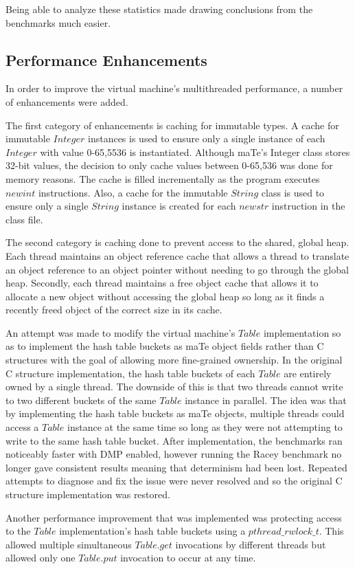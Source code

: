 Being able to analyze these statistics made drawing conclusions from
the benchmarks much easier.

\subsection{Performance Enhancements}

In order to improve the virtual machine's multithreaded performance, a
number of enhancements were added.

The first category of enhancements is caching for immutable types.  A
cache for immutable $Integer$ instances is used to ensure only a
single instance of each $Integer$ with value 0-65,5536 is
instantiated.  Although maTe's Integer class stores 32-bit values, the
decision to only cache values between 0-65,536 was done for memory
reasons.  The cache is filled incrementally as the program executes
$newint$ instructions.  Also, a cache for the immutable $String$ class
is used to ensure only a single $String$ instance is created for each
$newstr$ instruction in the class file.

The second category is caching done to prevent access to the shared,
global heap.  Each thread maintains an object reference cache that
allows a thread to translate an object reference to an object pointer
without needing to go through the global heap.  Secondly, each thread
maintains a free object cache that allows it to allocate a new object
without accessing the global heap so long as it finds a recently freed
object of the correct size in its cache.

An attempt was made to modify the virtual machine's $Table$
implementation so as to implement the hash table buckets as maTe
object fields rather than C structures with the goal of allowing more
fine-grained ownership.  In the original C structure implementation,
the hash table buckets of each $Table$ are entirely owned by a single
thread.  The downside of this is that two threads cannot write to two
different buckets of the same $Table$ instance in parallel.  The idea
was that by implementing the hash table buckets as maTe objects,
multiple threads could access a $Table$ instance at the same time so
long as they were not attempting to write to the same hash table
bucket.  After implementation, the benchmarks ran noticeably faster
with DMP enabled, however running the Racey benchmark no longer gave
consistent results meaning that determinism had been lost.  Repeated
attempts to diagnose and fix the issue were never resolved and so the
original C structure implementation was restored.

Another performance improvement that was implemented was protecting
access to the $Table$ implementation's hash table buckets using a
$pthread\_rwlock\_t$.  This allowed multiple simultaneous $Table.get$
invocations by different threads but allowed only one $Table.put$
invocation to occur at any time.


